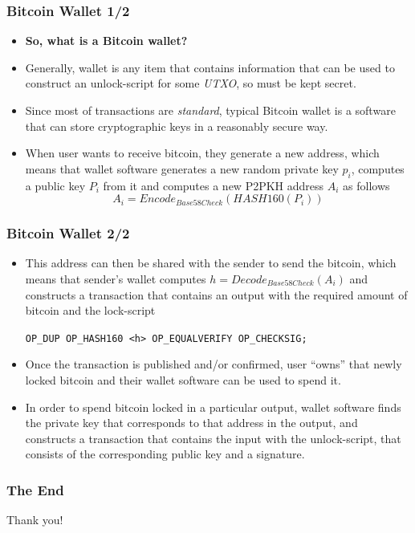 \documentclass{beamer}
\begin{document}
\begin{frame}[fragile]
  \frametitle{Bitcoin Wallet 1/2}
  \begin{itemize}
  \item \textbf{So, what is a Bitcoin wallet?}
  \item Generally, wallet is any item that contains information that can be used
    to construct an unlock-script for some \textit{UTXO}, so must be kept secret.
  \item Since most of transactions are \textit{standard}, typical Bitcoin wallet
    is a software that can store cryptographic keys in a reasonably secure way.
  \item When user wants to receive bitcoin, they generate a new address, which
    means that wallet software generates a new random private key $p_i$, computes a
    public key $P_i$ from it and computes a new P2PKH address $A_i$ as follows
    $$A_i = Encode_{Base58Check}(HASH160(P_i))$$
  \end{itemize}
\end{frame}

\begin{frame}[fragile]
  \frametitle{Bitcoin Wallet 2/2}
  \begin{itemize}
  \item This address can then be shared with the sender to send the bitcoin,
    which means that sender's wallet computes $h = Decode_{Base58Check}(A_i)$
    and constructs a transaction that contains an output with the required
    amount of bitcoin and the lock-script
    \begin{center}
      \tiny\texttt{OP_DUP OP_HASH160 <h> OP_EQUALVERIFY OP_CHECKSIG;}
    \end{center}
  \item Once the transaction is published and/or confirmed, user ``owns'' that
    newly locked bitcoin and their wallet software can be used to spend it.
  \item In order to spend bitcoin locked in a particular output, wallet software
    finds the private key that corresponds to that address in the output, and
    constructs a transaction that contains the input with the unlock-script,
    that consists of the corresponding public key and a signature.
  \end{itemize}
\end{frame}

\begin{frame}
  \frametitle{The End}
  \begin{center}
    Thank you!
  \end{center}
\end{frame}
\end{document}
